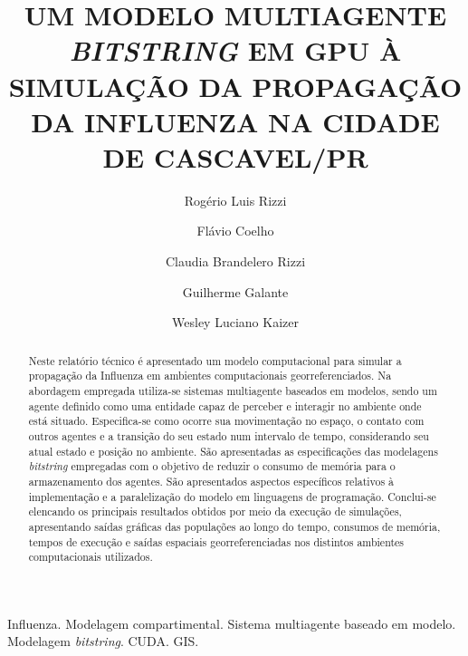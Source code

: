 \sloppy
\begin{frontmatter}
\title{UM MODELO MULTIAGENTE \textit{BITSTRING} EM GPU À SIMULAÇÃO DA PROPAGAÇÃO DA INFLUENZA NA CIDADE DE CASCAVEL/PR}
\author[unioeste]{Rogério Luis Rizzi}
\author[fgv]{Flávio Coelho}
\author[unioeste]{Claudia Brandelero Rizzi}
\author[unioeste]{Guilherme Galante}
\author[unioeste]{Wesley Luciano Kaizer}
\address[unioeste]{Centro de Ciências Exatas e Tecnológicas, Universidade Estadual do Oeste do Paraná - Cascavel/PR, Brasil.}
\address[fgv]{EMAp - Escola de Matemática Aplicada, Fundação Getúlio Vargas - Rio de Janeiro/RJ, Brasil.}

\begin{abstract}
Neste relatório técnico é apresentado um modelo computacional para simular a propagação da Influenza em ambientes computacionais georreferenciados. Na abordagem empregada utiliza-se sistemas multiagente baseados em modelos, sendo um agente definido como uma entidade capaz de perceber e interagir no ambiente onde está situado. Especifica-se como ocorre sua movimentação no espaço, o contato com outros agentes e a transição do seu estado num intervalo de tempo, considerando seu atual estado e posição no ambiente. São apresentadas as especificações das modelagens \textit{bitstring} empregadas com o objetivo de reduzir o consumo de memória para o armazenamento dos agentes. São apresentados aspectos específicos relativos à implementação e a paralelização do modelo em linguagens de programação. Conclui-se elencando os principais resultados obtidos por meio da execução de simulações, apresentando saídas gráficas das populações ao longo do tempo, consumos de memória, tempos de execução e saídas espaciais georreferenciadas nos distintos ambientes computacionais utilizados. 
\end{abstract}

\begin{keyword}
Influenza. Modelagem compartimental. Sistema multiagente baseado em modelo. Modelagem \textit{bitstring}. CUDA. GIS.
\end{keyword}

\end{frontmatter}

\newpage
